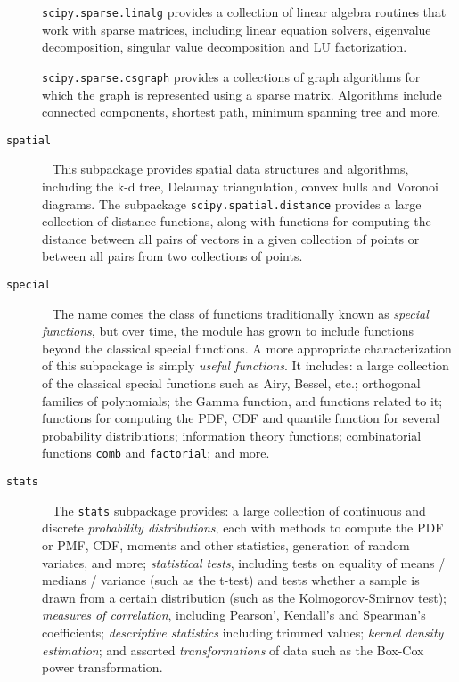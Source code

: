 \begin{description}
    \texttt{scipy.sparse.linalg} provides a collection of linear algebra
    routines that work with sparse matrices, including linear equation
    solvers, eigenvalue decomposition, singular value decomposition
    and LU factorization.

    \texttt{scipy.sparse.csgraph} provides a collections of graph algorithms
    for which the graph is represented using a sparse matrix.  Algorithms
    include connected components, shortest path, minimum spanning tree
    and more.
\item[\texttt{spatial}] ~ \newline
    This subpackage provides spatial data structures and algorithms,
    including the k-d tree, Delaunay triangulation, convex hulls and Voronoi
    diagrams.  The subpackage \texttt{scipy.spatial.distance} provides
    a large collection of distance functions, along with functions for
    computing the distance between all pairs of vectors in a given collection
    of points or between all pairs from two collections of points.
\item[\texttt{special}] ~ \newline
    The name comes the class of functions traditionally known as \emph{special
    functions}, but over time, the module has grown to include functions
    beyond the classical special functions.  A more appropriate characterization
    of this subpackage is simply \emph{useful functions}.
    It includes: a large collection of the classical special functions
    such as Airy, Bessel, etc.; orthogonal families of polynomials;
    the Gamma function, and functions related to it;
    functions for computing the PDF, CDF and quantile function for several
    probability distributions;
    information theory functions;
    combinatorial functions \texttt{comb} and \texttt{factorial};
    and more.
\item[\texttt{stats}] ~ \newline
    The \texttt{stats} subpackage provides: a large collection of continuous
    and discrete \emph{probability distributions}, each with methods to compute
    the PDF or PMF, CDF, moments and other statistics, generation of random
    variates, and more;
    \emph{statistical tests}, including tests on equality of means / medians /
		variance (such as the t-test) and tests whether a sample is drawn from a
		certain distribution (such as the Kolmogorov-Smirnov test);
		\emph{measures of correlation}, including Pearson', Kendall's and Spearman's
		coefficients;
		\emph{descriptive statistics} including trimmed values;		
		\emph{kernel density estimation};
    and assorted \emph{transformations} of data such as the Box-Cox power
		transformation.
\end{description}
